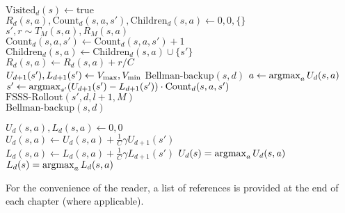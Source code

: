 \begin{algorithm}[tb]
	\caption{$\mbox{FSSS-Rollout}(s, d, C, l, M)$}
	\label{alg:fs3-rollout}
	 {
		\Return
	}
	 {
		$\mbox{Visited}_d(s) \leftarrow \mbox{true}$\\
		 {
			$R_d(s,a),\mbox{Count}_d(s,a,s'),\mbox{Children}_d(s,a) \leftarrow 0, 0, \{\}$\\
			 {
				$s', r \sim T_M(s, a), R_M(s,a)$ \\
				$\mbox{Count}_d(s,a,s') \leftarrow \mbox{Count}_d(s,a,s') + 1$ \\
				$\mbox{Children}_d(s,a) \leftarrow \mbox{Children}_d(s,a) \cup \{s'\}$ \\
				$R_d(s,a) \leftarrow R_d(s, a)+r/C$\\
				 {
					 $U_{d+1}(s'), L_{d+1}(s') \leftarrow V_{\rm max}, V_{\rm min}$
				}
			}
		}
		$\mbox{Bellman-backup}(s, d)$
	}
	$a \leftarrow \argmax_a U_d(s,a)$\\
	$s' \leftarrow \argmax_{s'} (U_{d+1}(s')-L_{d+1}(s')) \cdot \mbox{Count}_d(s,a,s')$\\
	$\mbox{FSSS-Rollout}(s', d, l+1, M)$\\
	$\mbox{Bellman-backup}(s, d)$\\
	\Return
\end{algorithm}

\begin{algorithm}[tb]
	\caption{$\mbox{Bellman-backup}(s, d)$}
	\label{alg:bellman}
	 {
		$U_d(s,a), L_d(s,a) \leftarrow 0, 0$\\
		 {
			$U_d(s,a) \leftarrow U_d(s,a) + \frac 1 C \gamma U_{d+1}(s')$\\
			$L_d(s,a) \leftarrow L_d(s,a) + \frac 1 C \gamma L_{d+1}(s')$
		}
	}
	$U_d(s) = \argmax_a U_d(s,a)$\\
	$L_d(s) = \argmax_a L_d(s,a)$\\
	\Return
\end{algorithm}

%
\ifperchapterbib%
For the convenience of the reader, a list of references is provided at the end of each chapter (where applicable).
\ifendbib%
\else\fi%
\else\fi%
